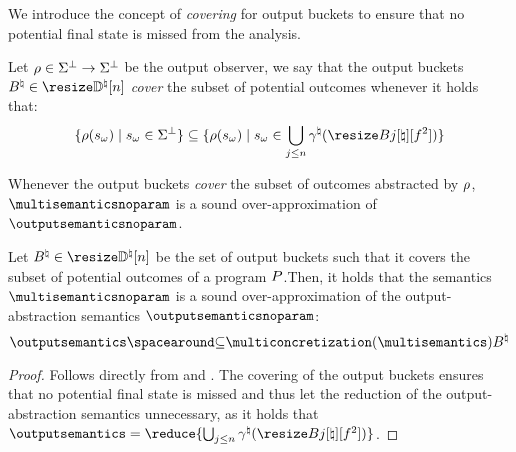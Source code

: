 We introduce the concept of \emph{covering} for output buckets to ensure that no potential final state is missed from the analysis.

\begin{definition}[Covering]\label{def:covering}
  Let $\rho\in\Sigma^\bot\to\Sigma^\bot$ be the output observer, we say that the output buckets $\buckets\in\vectorbuckets$ \textit{cover} the subset of potential outcomes whenever it holds that:
  \[
    \setdef{\outputobs(\retrieveoutput\defstate)}{\retrieveoutput{\defstate} \in \stateandbottom} \subseteq \setdef{\outputobs(\retrieveoutput\defstate)}{\retrieveoutput\defstate\in\bigsetjoin_{j\le n}\abstractdomainconcretization(\bucket)}
  \]
\end{definition}


Whenever the output buckets \textit{cover} the subset of outcomes abstracted by $\rho$, $\multisemanticsnoparam$ is a sound over-approximation of $\outputsemanticsnoparam$.

\begin{lemma}
  Let $\buckets\in\vectorbuckets$ be the set of output buckets such that it covers the subset of potential outcomes of a program $P$.Then, it holds that the semantics $\multisemanticsnoparam$ is a \textup{sound over-approximation} of the output-abstraction semantics $\outputsemanticsnoparam$:
  \[
    \outputsemantics \SubseteQ \multiconcretization(\multisemantics)\buckets
  \]
\end{lemma}
\begin{proof}
  Follows directly from  and . The covering of the output buckets ensures that no potential final state is missed and thus let the reduction of the output-abstraction semantics unnecessary, as it holds that $\outputsemantics = \reduce{\bigsetjoin_{j\le n}\abstractdomainconcretization(\bucket)}$.
\end{proof}






